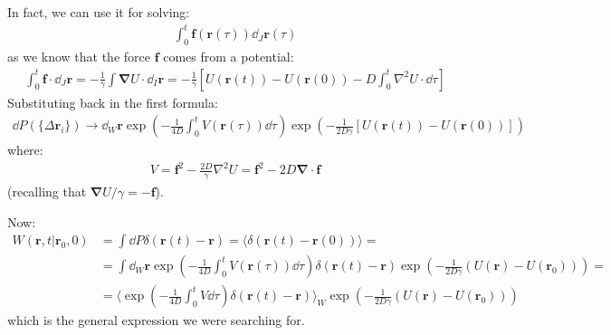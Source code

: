 \documentclass[../template.tex]{subfiles}
\begin{document}
 In fact, we can use it for solving:
 \begin{align*}
     \int_0^t \bm{f}(\bm{r}(\tau)) \dd{_J \bm{r}(\tau)}
 \end{align*}
 as we know that the force $\bm{f}$ comes from a potential:
 \begin{align*}
     \int_0^t \bm{f} \cdot \dd{_J \bm{r}} = -\frac{1}{\gamma} \int \bm{\nabla} U \cdot \dd{_I} \bm{r} = -\frac{1}{\gamma} \left[U(\bm{r}(t)) - U(\bm{r}(0)) - D \int_0^t \nabla^2 U \cdot \dd{\tau}\right] 
 \end{align*} 
 Substituting back in the first formula:
 \begin{align*}
     \dd{P}(\{\Delta \bm{r}_i\}) \to \dd{_W} \bm{r} \exp\left(-\frac{1}{4 D } \int_0^t V(\bm{r}(\tau))\dd{\tau} \right) \exp\left(-\frac{1}{2D \gamma} [U(\bm{r}(t)) - U(\bm{r}(0))]\right)
 \end{align*}
 where:
 \begin{align*}
     V= \bm{f}^2 - \frac{2D}{\gamma}  \nabla^2 U = \bm{f}^2 - 2D \bm{\nabla} \cdot \bm{f}
 \end{align*}
 (recalling that $\bm{\nabla}U/\gamma = - \bm{f}$).

 Now:
 \begin{align*}
     W(\bm{r},t | \bm{r}_0, 0) &= \int \dd{P} \delta(\bm{r}(t) - \bm{r}) = \langle \delta(\bm{r}(t)- \bm{r}(0)) \rangle = \\
     &= \int \dd{_W \bm{r}} \exp\left(-\frac{1}{4D} \int_0^t V(\bm{r}(\tau)) \dd{\tau} \right) \delta(\bm{r}(t) - \bm{r}) \exp\left(-\frac{1}{2D \gamma} (U(\bm{r}) - U(\bm{r}_0))\right) =\\
     &= \langle \exp\left(-\frac{1}{4D} \int_0^t V \dd{\tau} \right)  \delta (\bm{r}(t) - \bm{r})\rangle_W \exp\left(-\frac{1}{2D \gamma} (U(\bm{r})- U(\bm{r}_0))\right)
 \end{align*}
 which is the general expression we were searching for.
\end{document}
